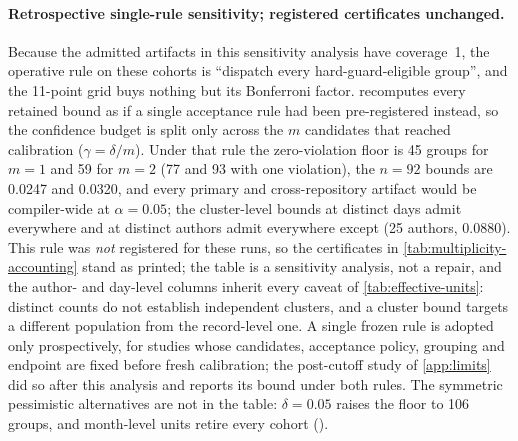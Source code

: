 \paragraph{Retrospective single-rule sensitivity; registered certificates
unchanged.}
Because the admitted artifacts in this sensitivity analysis have coverage~1, the operative
rule on these cohorts is ``dispatch every hard-guard-eligible group'', and the
11-point grid buys nothing but its Bonferroni factor. 
recomputes every retained bound as if a single acceptance rule had been
pre-registered instead, so the confidence budget is split only across the $m$
candidates that reached calibration ($\gamma=\delta/m$). Under that rule the
zero-violation floor is 45 groups for $m=1$ and 59 for $m=2$ (77 and 93 with
one violation), the $n=92$ bounds are 0.0247 and 0.0320, and every primary and
cross-repository artifact would be compiler-wide at $\alpha=0.05$; the
cluster-level bounds at distinct days admit everywhere and at distinct authors
admit everywhere except  (25 authors, 0.0880). This
rule was \emph{not} registered for these runs, so the certificates in
\cref{tab:multiplicity-accounting} stand as printed; the table is a
sensitivity analysis, not a repair, and the author- and day-level columns
inherit every caveat of \cref{tab:effective-units}: distinct counts do not
establish independent clusters, and a cluster bound targets a different
population from the record-level one. A single frozen rule is adopted only
prospectively, for studies whose candidates, acceptance policy, grouping and
endpoint are fixed before fresh calibration; the
post-cutoff study of \cref{app:limits} did so after this analysis and reports
its bound under both rules. The symmetric pessimistic alternatives are not in
the table: $\delta=0.05$ raises the floor to 106 groups, and month-level units
retire every cohort ().

\begin{table}[t]
  \centering
  \caption{Retrospective single-rule sensitivity. Each row recomputes the
  retained all-eligible calibration table ($n/k$ from the widest row of
  ) under one pre-registered acceptance rule
  with $\gamma=\delta/m$; ``registered'' is the grid certificate as printed.
  Day and author columns apply the same rule to the distinct-unit counts of
  \cref{tab:effective-units} (count in parentheses). Hypothetical bounds for
  the already selected artifacts; not new certificates.}
  \label{tab:single-rule}
  \footnotesize
  \setlength{\tabcolsep}{4pt}
  
\end{table}

